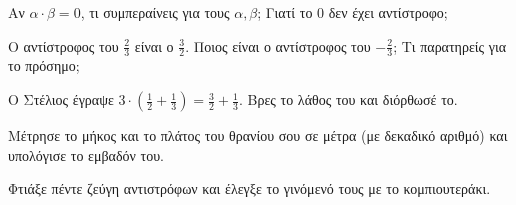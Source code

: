 \ex Αν $\alpha\cdot\beta=0$, τι συμπεραίνεις για τους $\alpha,\beta$; Γιατί το $0$ δεν έχει αντίστροφο;

\ex Ο αντίστροφος του $\frac{2}{3}$ είναι ο $\frac{3}{2}$. Ποιος είναι ο αντίστροφος του $-\frac{2}{3}$; Τι παρατηρείς για το πρόσημο;

\ex Ο Στέλιος έγραψε $3\cdot\left(\frac{1}{2}+\frac{1}{3}\right)=\frac{3}{2}+\frac{1}{3}$. Βρες το λάθος του και διόρθωσέ το.


\ex Μέτρησε το μήκος και το πλάτος του θρανίου σου σε μέτρα (με δεκαδικό αριθμό) και υπολόγισε το εμβαδόν του.

\ex Φτιάξε πέντε ζεύγη αντιστρόφων και έλεγξε το γινόμενό τους με το κομπιουτεράκι.
